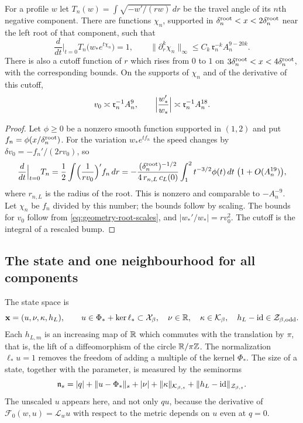 \begin{lemma}
\label{lem:quantitative-optical-controls}
For a profile $w$ let
$T_n(w)=\int\sqrt{-w'/(rw)}\,dr$ be the travel angle of its $n$th
negative component. There are functions $\chi_n$, supported in
$\delta_n^{\rm root}<x<2\delta_n^{\rm root}$ near the left root of
that component, such that
\[
 \frac{d}{dt}\Big|_{t=0}T_n\bigl(w_*e^{t\chi_n}\bigr)=1,
 \qquad \|\partial_r^k\chi_n\|_\infty
       \le C_k\,\mathfrak r_n^{-k}A_n^{9-20k}.
\]
There is also a cutoff function of $r$ which rises from $0$ to $1$ on
$3\delta_n^{\rm root}<x<4\delta_n^{\rm root}$, with the corresponding
bounds. On the supports of $\chi_n$ and of the derivative of this
cutoff,
\[
 v_0\asymp\mathfrak r_n^{-1}A_n^9,\qquad
 \Bigl|\frac{w_*'}{w_*}\Bigr|\asymp\mathfrak r_n^{-1}A_n^{18}.
\]
\end{lemma}

\begin{proof}
Let $\phi\ge0$ be a nonzero smooth function supported in $(1,2)$ and
put $f_n=\phi(x/\delta_n^{\rm root})$. For the variation
$w_*e^{tf_n}$ the speed changes by $\delta v_0=-f_n'/(2rv_0)$, so
\[
 \frac{d}{dt}\Big|_{t=0}T_n
 =\frac12\int\Bigl(\frac1{rv_0}\Bigr)'f_n\,dr
 =-\frac{(\delta_n^{\rm root})^{-1/2}}{4\,r_{n,L}\,c_L(0)}
       \int_1^2t^{-3/2}\phi(t)\,dt\;\bigl(1+O(A_n^{19})\bigr),
\]
where $r_{n,L}$ is the radius of the root. This is nonzero and
comparable to $-A_n^{-9}$. Let $\chi_n$ be $f_n$ divided by this
number; the bounds follow by scaling. The bounds for $v_0$ follow
from \eqref{eq:geometry-root-scales}, and $|w_*'/w_*|=rv_0^2$. The
cutoff is the integral of a rescaled bump.
\end{proof}

\subsection{The state and one neighbourhood for all components}
\label{subsec:neighbourhood}

The state space is
\begin{equation}\label{eq:rewrite-state}
 \mathbf x=(u,\nu,\kappa,h_L),\qquad
 u\in\Phi_*+\ker\ell_*\subset\mathcal X_\beta,\quad
 \nu\in\mathbb R,\quad
 \kappa\in\mathcal K_\beta,\quad
 h_L-\mathrm{id}\in\mathcal Z_{\beta,\mathrm{odd}} .
\end{equation}
Each $h_{L,m}$ is an increasing map of $\mathbb R$ which commutes with the
translation by $\pi$, that is, the lift of a diffeomorphism of the
circle $\mathbb R/\pi\mathbb Z$. The normalization $\ell_*u=1$ removes the freedom
of adding a multiple of the kernel $\Phi_*$. The size of a state,
together with the parameter, is measured by the seminorms
\begin{equation}\label{def:joint-displacement-seminorms}
 \mathfrak n_s=|q|+\|u-\Phi_*\|_s+|\nu|
           +\|\kappa\|_{\mathcal K_{\beta,s}}
           +\|h_L-\mathrm{id}\|_{\mathcal Z_{\beta,s}} .
\end{equation}
The unscaled $u$ appears here, and not only $qu$, because the
derivative of $\mathcal F_0(w,u)=\mathscr L_wu$ with respect to the
metric depends on $u$ even at $q=0$.

